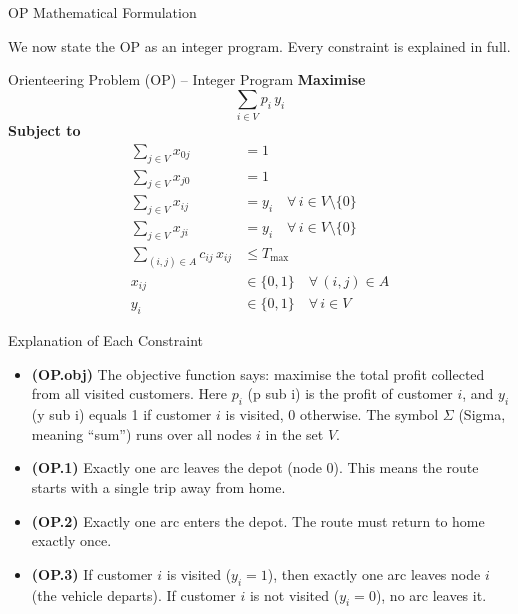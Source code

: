 \documentclass[aspectratio=169,10pt]{beamer}
\begin{document}
\begin{frame}[allowframebreaks]{OP Mathematical Formulation}

  We now state the OP as an integer program.
  Every constraint is explained in full.

  \medskip
  \begin{block}{Orienteering Problem (OP) -- Integer Program}
    \textbf{Maximise}
    \[
      \sum_{i \in V} p_i \, y_i
      \tag{OP.obj}
    \]
    \textbf{Subject to}
    \begin{align}
      \sum_{j \in V} x_{0j} &= 1
      \tag{OP.1} \\
      \sum_{j \in V} x_{j0} &= 1
      \tag{OP.2} \\
      \sum_{j \in V} x_{ij} &= y_i
      \quad \forall\, i \in V \setminus \{0\}
      \tag{OP.3} \\
      \sum_{j \in V} x_{ji} &= y_i
      \quad \forall\, i \in V \setminus \{0\}
      \tag{OP.4} \\
      \sum_{(i,j) \in A} c_{ij} \, x_{ij} &\le T_{\max}
      \tag{OP.5} \\
      x_{ij} &\in \{0,1\}
      \quad \forall\, (i,j) \in A
      \tag{OP.6} \\
      y_i    &\in \{0,1\}
      \quad \forall\, i \in V
      \tag{OP.7}
    \end{align}
  \end{block}

  \framebreak

  \begin{block}{Explanation of Each Constraint}
    \begin{itemize}
      \item \textbf{(OP.obj)} The objective function says: maximise the
            total profit collected from all visited customers.
            Here $p_i$ (p sub i) is the profit of customer $i$, and
            $y_i$ (y sub i) equals 1 if customer $i$ is visited, 0 otherwise.
            The symbol $\Sigma$ (Sigma, meaning ``sum'') runs over all
            nodes $i$ in the set $V$.

      \item \textbf{(OP.1)} Exactly one arc leaves the depot (node 0).
            This means the route starts with a single trip away from home.

      \item \textbf{(OP.2)} Exactly one arc enters the depot.
            The route must return to home exactly once.

      \item \textbf{(OP.3)} If customer $i$ is visited ($y_i = 1$), then
            exactly one arc leaves node $i$ (the vehicle departs).
            If customer $i$ is not visited ($y_i = 0$), no arc leaves it.


\end{itemize}
\end{block}
\end{frame}
\end{document}
